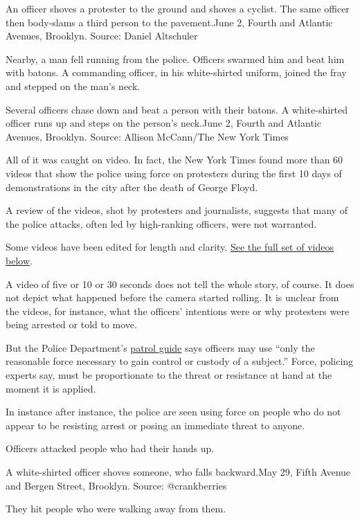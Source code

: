 An officer shoves a protester to the ground and shoves a cyclist. The
same officer then body-slams a third person to the pavement.June 2,
Fourth and Atlantic Avenues, Brooklyn. Source: Daniel Altschuler

Nearby, a man fell running from the police. Officers swarmed him and
beat him with batons. A commanding officer, in his white-shirted
uniform, joined the fray and stepped on the man's neck.

Several officers chase down and beat a person with their batons. A
white-shirted officer runs up and steps on the person's neck.June 2,
Fourth and Atlantic Avenues, Brooklyn. Source: Allison McCann/The New
York Times

All of it was caught on video. In fact, the New York Times found more
than 60 videos that show the police using force on protesters during the
first 10 days of demonstrations in the city after the death of George
Floyd.

A review of the videos, shot by protesters and journalists, suggests
that many of the police attacks, often led by high-ranking officers,
were not warranted.

Some videos have been edited for length and clarity.
\protect\hyperlink{full-list-incidents}{See the full set of videos
below}.

A video of five or 10 or 30 seconds does not tell the whole story, of
course. It does not depict what happened before the camera started
rolling. It is unclear from the videos, for instance, what the officers'
intentions were or why protesters were being arrested or told to move.

But the Police Department's
\href{https://www1.nyc.gov/assets/nypd/downloads/pdf/public_information/public-pguide3.pdf}{patrol
guide} says officers may use ``only the reasonable force necessary to
gain control or custody of a subject.'' Force, policing experts say,
must be proportionate to the threat or resistance at hand at the moment
it is applied.

In instance after instance, the police are seen using force on people
who do not appear to be resisting arrest or posing an immediate threat
to anyone.

Officers attacked people who had their hands up.

A white-shirted officer shoves someone, who falls backward.May 29, Fifth
Avenue and Bergen Street, Brooklyn. Source: @crankberries

They hit people who were walking away from them.

